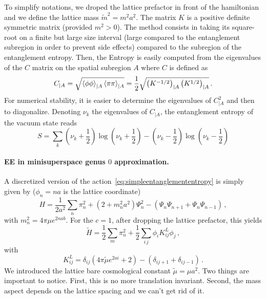 \documentclass[a4paper]{article}
\begin{document}
To simplify notations, we droped the lattice prefactor in front of the hamiltonian and we define the lattice mass $\tilde{m}^2=m^2 a^2$. The matrix $K$ is a positive definite symmetric matrix (provided $m^2>0$). The method consists in taking its square-root on a finite but large size interval (large compared to the entanglement subregion in order to prevent side effects) compared to the subregion of the entanglement entropy. Then, the Entropy is easily computed from the eigenvalues of the $C$ matrix on the spatial subregion $A$ where $C$ is defined as
\begin{equation}
  C_{|A} = \sqrt{\braket{\phi \phi}_{|A} \braket{\pi \pi}_{|A}}  = \frac{1}{2}\sqrt{\left(K^{-1/2}\right)_{|A} \left(K^{1/2}\right)_{|A}}\,.
\end{equation}
For numerical stability, it is easier to determine the eigenvalues of $C^2_{|A}$ and then to diagonalize. Denoting $\nu_k$ the eigenvalues of $C_{|A}$, the entanglement entropy of the vacuum state reads
\begin{equation}
  S = \sum_k \left(\nu_k+\frac{1}{2}\right)\log\left(\nu_k +\frac{1}{2}\right) - \left(\nu_k-\frac{1}{2}\right)\log\left(\nu_k -\frac{1}{2}\right)
\end{equation}
\paragraph{EE in minisuperspace genus $0$ approximation.}
A discretized version of the action~\eqref{eq:simpleentanglemententropy} is simply given by ($\phi_n=n a$ is the lattice coordinate)
\begin{equation}
  H = \frac{1}{2a^2}\sum_n \pi_n^2 +(2+m_n^2 a^2)\Psi_n^2 -(\Psi_n\Psi_{n+1}+\Psi_n\Psi_{n-1})\,,
\end{equation}
with $m_n^2 = 4\pi \mu e^{2 n a b}$. For the $c=1$, after dropping the lattice prefactor, this yields
\begin{equation}
  \tilde{H} = \frac{1}{2}\sum_m \pi_n^2 + \frac{1}{2}\sum_{i\,j}\phi_i K^{L}_{ij}\phi_j\,,
\end{equation}
with
\begin{equation}
  K^{L}_{ij}= \delta_{ij}\left(4\pi \tilde{\mu} e^{2 a i} + 2\right)-\left(\delta_{i j+1}+ \delta_{i j-1}\right)\,.
\end{equation}
We introduced the lattice bare cosmological constant $\tilde{\mu} = \mu a^2$. Two things are important to notice. First, this is no more translation invariant. Second, the mass aspect depends on the lattice spacing and we can't get rid of it.
\end{document}
